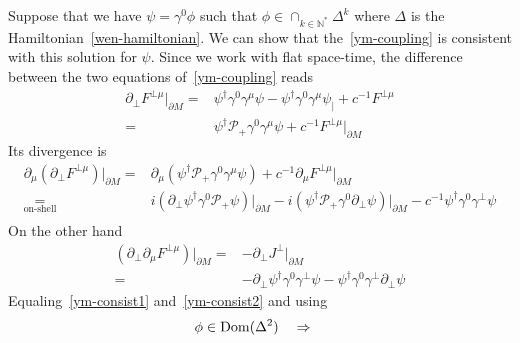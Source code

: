 \begin{remark}
Suppose that we have $\psi = \gamma^0\phi$ such that $\phi\in \cap_{k\in\mathbb{N}^*}\Delta^k$ where $\Delta$ is the Hamiltonian~\cref{wen-hamiltonian}.
We can show that the~\cref{ym-coupling} is consistent with this solution for $\psi$.
Since we work with flat space-time, 
the difference between the two equations of~\cref{ym-coupling} reads
\begin{equation*}
\begin{split}
\partial_\bot F^{\bot \mu}\vert_{\partial M} = & \psi^\dagger\gamma^0\gamma^\mu\psi - \psi^\dagger\gamma^0\gamma^\mu\psi_| + c^{-1} F^{\bot \mu} \\
= & \psi^\dagger\mathcal{P}_+\gamma^0\gamma^\mu\psi + c^{-1}F^{\bot \mu }\vert_{\partial M}
\end{split}
\end{equation*}
Its divergence is
\begin{equation}\label{ym-consist1}
\begin{split}
\partial_\mu(\partial_\bot F^{\bot \mu})\vert_{\partial M} = & \partial_\mu(\psi^\dagger\mathcal{P}_+\gamma^0\gamma^\mu\psi) + c^{-1}\partial_\mu F^{\bot \mu}\vert_{\partial M} \\
\underset{\textrm{on-shell}}{=} & 
i(\partial_\bot\psi^\dagger\gamma^0\mathcal{P}_+\psi)\vert_{\partial M} - 
i(\psi^\dagger\mathcal{P}_+\gamma^0\partial_\bot\psi)\vert_{\partial M}
- c^{-1} \psi^\dagger\gamma^0\gamma^\bot\psi \\
\end{split}
\end{equation}
On the other hand
\begin{equation}\label{ym-consist2}
\begin{split}
(\partial_\bot\partial_\mu F^{\bot \mu})\vert_{\partial M} = & -\partial_\bot J^\bot\vert_{\partial M} \\
= & -\partial_\bot \psi^\dagger\gamma^0\gamma^\bot\psi 
-\psi^\dagger\gamma^0\gamma^\bot\partial_\bot\psi
\end{split}
\end{equation}
Equaling~\cref{ym-consist1} and~\cref{ym-consist2} and using
\begin{equation*}
\phi\in\dom(\Delta^2) \quad\Rightarrow\quad 

\end{equation*}
\end{remark}
